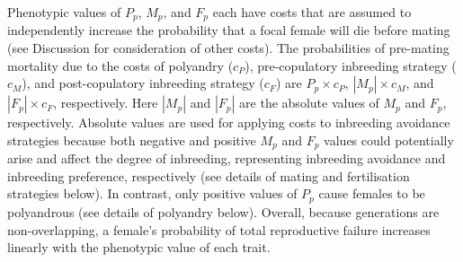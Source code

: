 \documentclass[10pt,letterpaper]{article}
\begin{document}
Phenotypic values of $P_{p}$, $M_{p}$, and $F_{p}$ each have costs that are assumed to independently increase the probability that a focal female will die before mating (see Discussion for consideration of other costs). The probabilities of pre-mating mortality due to the costs of polyandry ($c_{P}$), pre-copulatory inbreeding strategy ($c_{M}$), and post-copulatory inbreeding strategy ($c_{F}$) are $P_{p} \times c_{P}$, $|M_{p}| \times c_{M}$, and $|F_{p}| \times c_{F}$, respectively. Here $|M_{p}|$ and $|F_{p}|$ are the absolute values of $M_{p}$ and $F_{p}$, respectively. Absolute values are used for applying costs to inbreeding avoidance strategies because both negative and positive $M_{p}$ and $F_{p}$ values could potentially arise and affect the degree of inbreeding, representing inbreeding avoidance and inbreeding preference, respectively (see details of mating and fertilisation strategies below). In contrast, only positive values of $P_{p}$ cause females to be polyandrous (see details of polyandry below). Overall, because generations are non-overlapping, a female's probability of total reproductive failure increases linearly with the phenotypic value of each trait.

\vspace{5 mm}
\end{document}
